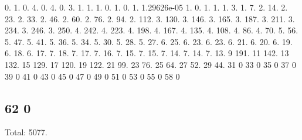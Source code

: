 0. 1. 0. 4. 0. 4. 0. 3. 1. 1. 1. 0. 1. 0. 1. 1.\+29626e-\/05 1. 0. 1. 1. 1. 3. 1. 7. 2. 14. 2. 23. 2. 33. 2. 46. 2. 60. 2. 76. 2. 94. 2. 112. 3. 130. 3. 146. 3. 165. 3. 187. 3. 211. 3. 234. 3. 246. 3. 250. 4. 242. 4. 223. 4. 198. 4. 167. 4. 135. 4. 108. 4. 86. 4. 70. 5. 56. 5. 47. 5. 41. 5. 36. 5. 34. 5. 30. 5. 28. 5. 27. 6. 25. 6. 23. 6. 23. 6. 21. 6. 20. 6. 19. 6. 18. 6. 17. 7. 18. 7. 17. 7. 16. 7. 15. 7. 15. 7. 14. 7. 14. 7. 13. 9 191. 11 142. 13 132. 15 129. 17 120. 19 122. 21 99. 23 76. 25 64. 27 52. 29 44. 31 0 33 0 35 0 37 0 39 0 41 0 43 0 45 0 47 0 49 0 51 0 53 0 55 0 58 0 \subsection*{62 0 }

Total\+: 5077. 